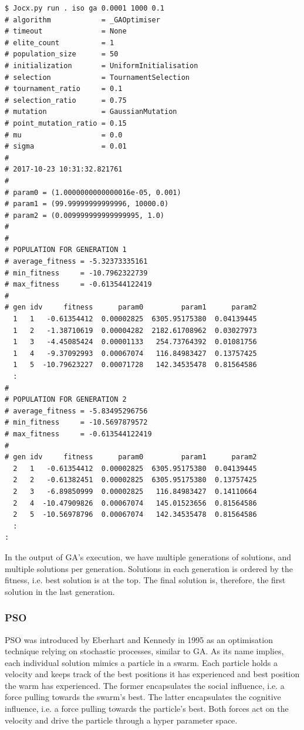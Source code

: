 \documentclass[graybox]{svmult}
\begin{document}
 {\scriptsize{}\begin{verbatim}
$ Jocx.py run . iso ga 0.0001 1000 0.1
# algorithm            = _GAOptimiser
# timeout              = None
# elite_count          = 1
# population_size      = 50
# initialization       = UniformInitialisation
# selection            = TournamentSelection
# tournament_ratio     = 0.1
# selection_ratio      = 0.75
# mutation             = GaussianMutation
# point_mutation_ratio = 0.15
# mu                   = 0.0
# sigma                = 0.01
#
# 2017-10-23 10:31:32.821761
#
# param0 = (1.0000000000000016e-05, 0.001)
# param1 = (99.99999999999996, 10000.0)
# param2 = (0.009999999999999995, 1.0)
#
#
# POPULATION FOR GENERATION 1
# average_fitness = -5.32373335161
# min_fitness     = -10.7962322739
# max_fitness     = -0.613544122419
#
# gen idv     fitness      param0         param1      param2
  1   1   -0.61354412  0.00002825  6305.95175380  0.04139445
  1   2   -1.38710619  0.00004282  2182.61708962  0.03027973
  1   3   -4.45085424  0.00001133   254.73764392  0.01081756
  1   4   -9.37092993  0.00067074   116.84983427  0.13757425
  1   5  -10.79623227  0.00071728   142.34535478  0.81564586
  :
#
# POPULATION FOR GENERATION 2
# average_fitness = -5.83495296756
# min_fitness     = -10.5697879572
# max_fitness     = -0.613544122419
#
# gen idv     fitness      param0         param1      param2
  2   1   -0.61354412  0.00002825  6305.95175380  0.04139445
  2   2   -0.61382451  0.00002825  6305.95175380  0.13757425
  2   3   -6.89850999  0.00002825   116.84983427  0.14110664
  2   4  -10.47909826  0.00067074   145.01523656  0.81564586
  2   5  -10.56978796  0.00067074   142.34535478  0.81564586
  :
:
\end{verbatim}}

In the output of GA's execution, we have multiple generations of solutions, and multiple solutions per generation. Solutions in each generation is ordered by the fitness, i.e. best solution is at the top. The final solution is, therefore, the first solution in the last generation.

\subsubsection{PSO}

PSO was introduced by Eberhart and Kennedy in 1995 \cite{eberhart1995new} as an optimisation technique relying on stochastic processes, similar to GA. As its name implies, each individual solution mimics a particle in a swarm. Each particle holds a velocity and keeps track of the best positions it has experienced and best position the warm has experienced. The former encapsulates the social influence, i.e. a force pulling towards the swarm's best. The latter encapsulates the cognitive influence, i.e. a force pulling towards the particle's best. Both forces act on the velocity and drive the particle through a hyper parameter space.
\end{document}
